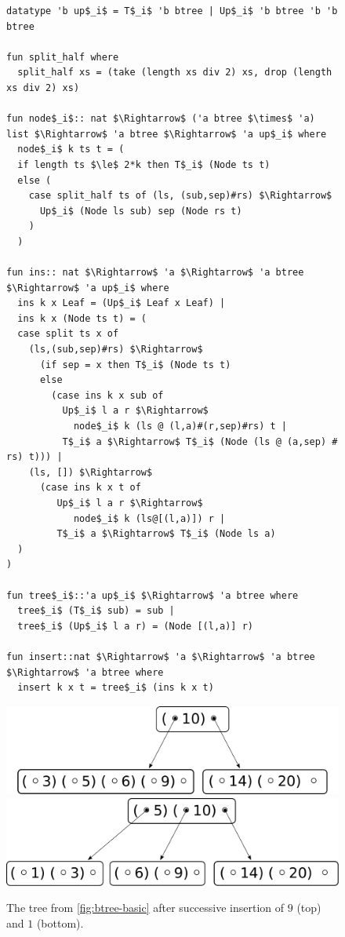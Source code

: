 \begin{figure}
    
\begin{lstlisting}[mathescape=true, language=Isabelle, label=lst:ins-fun, caption={
    The \textit{insert} function
}]
datatype 'b up$_i$ = T$_i$ 'b btree | Up$_i$ 'b btree 'b 'b btree

fun split_half where
  split_half xs = (take (length xs div 2) xs, drop (length xs div 2) xs)

fun node$_i$:: nat $\Rightarrow$ ('a btree $\times$ 'a) list $\Rightarrow$ 'a btree $\Rightarrow$ 'a up$_i$ where
  node$_i$ k ts t = (
  if length ts $\le$ 2*k then T$_i$ (Node ts t)
  else (
    case split_half ts of (ls, (sub,sep)#rs) $\Rightarrow$
      Up$_i$ (Node ls sub) sep (Node rs t)
    )
  )

fun ins:: nat $\Rightarrow$ 'a $\Rightarrow$ 'a btree $\Rightarrow$ 'a up$_i$ where
  ins k x Leaf = (Up$_i$ Leaf x Leaf) |
  ins k x (Node ts t) = (
  case split ts x of
    (ls,(sub,sep)#rs) $\Rightarrow$ 
      (if sep = x then T$_i$ (Node ts t)
      else
        (case ins k x sub of 
          Up$_i$ l a r $\Rightarrow$
            node$_i$ k (ls @ (l,a)#(r,sep)#rs) t | 
          T$_i$ a $\Rightarrow$ T$_i$ (Node (ls @ (a,sep) # rs) t))) |
    (ls, []) $\Rightarrow$
      (case ins k x t of
         Up$_i$ l a r $\Rightarrow$
            node$_i$ k (ls@[(l,a)]) r |
         T$_i$ a $\Rightarrow$ T$_i$ (Node ls a)
  )
)

fun tree$_i$::'a up$_i$ $\Rightarrow$ 'a btree where
  tree$_i$ (T$_i$ sub) = sub |
  tree$_i$ (Up$_i$ l a r) = (Node [(l,a)] r)

fun insert::nat $\Rightarrow$ 'a $\Rightarrow$ 'a btree $\Rightarrow$ 'a btree where
  insert k x t = tree$_i$ (ins k x t)
\end{lstlisting}

\end{figure}

\begin{figure}
    \centering
    \includegraphics[width=0.48\linewidth]{figures/btree-basic-ins9.pdf}\\
    \vspace*{1cm}
    \includegraphics[width=0.48\linewidth]{figures/btree-basic-ins9-ins1.pdf}
    \caption{The tree from \autoref{fig:btree-basic} after 
    successive insertion of $9$ (top) and $1$ (bottom).}
    \label{fig:btree-basic-ins}
\end{figure}

